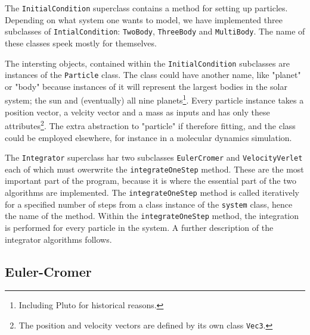\documentclass[10pt,a4paper]{amsart}
\begin{document}
The \lstinline|InitialCondition| superclass contains a method for setting up particles. Depending on what system one wants to model, we have implemented three subclasses of \lstinline|IntialCondition|: \lstinline|TwoBody|, \lstinline|ThreeBody| and \lstinline|MultiBody|. The name of these classes speek mostly for themselves.

The intersting objects, contained within the \lstinline|InitialCondition| subclasses are instances of the \lstinline|Particle| class. The class could have another name, like "planet" or "body" because instances of it will represent the largest bodies in the solar system; the sun and (eventually) all nine planets\footnote{Including Pluto for historical reasons.}. Every particle instance takes a position vector, a velcity vector and a mass as inputs and has only these attributes\footnote{The position and velocity vectors are defined by its own class \lstinline|Vec3|.}. The extra abstraction to "particle" if therefore fitting, and the class could be employed elsewhere, for instance in a molecular dynamics simulation.

The \lstinline|Integrator| superclass har two subclasses \lstinline|EulerCromer| and \lstinline|VelocityVerlet| each of which must owerwrite the \lstinline|integrateOneStep| method. These are the most important part of the program, because it is where the essential part of the two algorithms are implemented. The \lstinline|integrateOneStep| method is called iteratively for a specified number of steps from a class instance of the \lstinline|system| class, hence the name of the method. Within the \lstinline|integrateOneStep| method, the integration is performed for every particle in the system. A further description of the integrator algorithms follows.

\subsection{Euler-Cromer}
\end{document}
